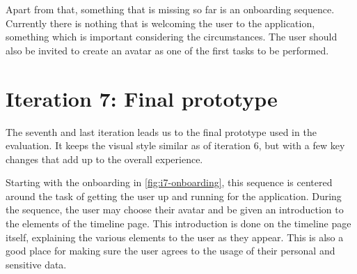 Apart from that, something that is missing so far is an onboarding sequence. Currently there is nothing that is welcoming the user to the application, something which is important considering the circumstances. The user should also be invited to create an avatar as one of the first tasks to be performed.

\section{Iteration 7: Final prototype}
\label{sec:iteration7}

The seventh and last iteration leads us to the final prototype used in the evaluation. It keeps the visual style similar as of iteration 6, but with a few key changes that add up to the overall experience.

Starting with the onboarding in \autoref{fig:i7-onboarding}, this sequence is centered around the task of getting the user up and running for the application. During the sequence, the user may choose their avatar and be given an introduction to the elements of the timeline page. This introduction is done on the timeline page itself, explaining the various elements to the user as they appear. This is also a good place for making sure the user agrees to the usage of their personal and sensitive data.

